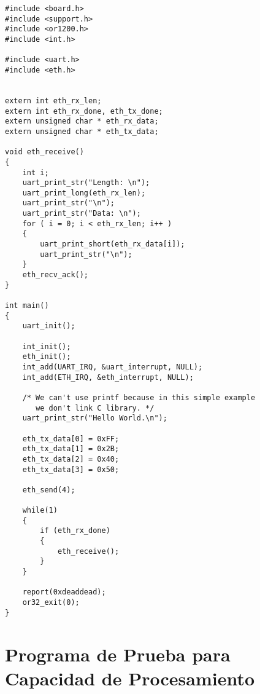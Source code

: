 \begin{verbatim}
#include <board.h>
#include <support.h>
#include <or1200.h>
#include <int.h>

#include <uart.h>
#include <eth.h>


extern int eth_rx_len;
extern int eth_rx_done, eth_tx_done;
extern unsigned char * eth_rx_data;
extern unsigned char * eth_tx_data;

void eth_receive()
{
	int i;
	uart_print_str("Length: \n");
	uart_print_long(eth_rx_len);
	uart_print_str("\n");
	uart_print_str("Data: \n");
	for ( i = 0; i < eth_rx_len; i++ )
	{
		uart_print_short(eth_rx_data[i]);
		uart_print_str("\n");
	}
	eth_recv_ack();
}

int main()
{
	uart_init();

	int_init();
	eth_init();
	int_add(UART_IRQ, &uart_interrupt, NULL);
	int_add(ETH_IRQ, &eth_interrupt, NULL);

	/* We can't use printf because in this simple example
	   we don't link C library. */
	uart_print_str("Hello World.\n");

	eth_tx_data[0] = 0xFF;
	eth_tx_data[1] = 0x2B;
	eth_tx_data[2] = 0x40;
	eth_tx_data[3] = 0x50;

	eth_send(4);

	while(1)
	{
		if (eth_rx_done)
		{
			eth_receive();
		}
	}

	report(0xdeaddead);
	or32_exit(0);
}
\end{verbatim}


 \section{Programa de Prueba para Capacidad de Procesamiento}

